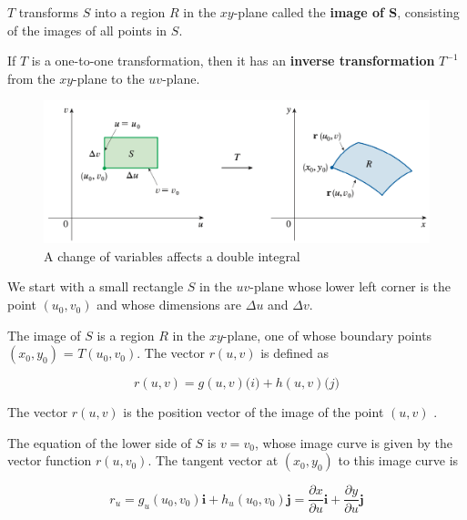 $T$ transforms $S$ into a region $R$ in the $xy$-plane called the \textbf{image of S}, consisting of the images of all points in $S$.

If $T$ is a one-to-one transformation, then it has an \textbf{inverse transformation} $T^{-1}$ from the $xy$-plane to the $uv$-plane.

\begin{figure}
    \centering
    \includegraphics[scale=0.3]{appendices/figures/fig009.png}
    \caption{A change of variables affects a double integral}
\end{figure}

We start with a small rectangle $S$ in the $uv$-plane whose lower left corner is the point $(u_0, v_0)$ and whose dimensions are $\Delta u$ and $\Delta v$.

The image of $S$ is a region $R$ in the $xy$-plane, one of whose boundary points $(x_0, y_0)$ = $T(u_0, v_0)$. The vector $r(u, v)$ is defined as

\begin{equation}
    r(u, v) = g(u, v) \mathbf(i) + h(u, v) \mathbf(j)
\end{equation}

The vector $r(u, v)$ is the position vector of the image of the point $(u, v)$ .

The equation of the lower side of $S$ is $v = v_0$, whose image curve is given by the vector function $r(u, v_0)$. The tangent vector at $(x_0, y_0)$ to this image curve is

\begin{equation}
    r_u = g_u(u_0, v_0)\mathbf{i} + h_u(u_0, v_0)\mathbf{j} = \frac{\partial x}{\partial u}\mathbf{i} + \frac{\partial y}{\partial u}\mathbf{j}
\end{equation}

